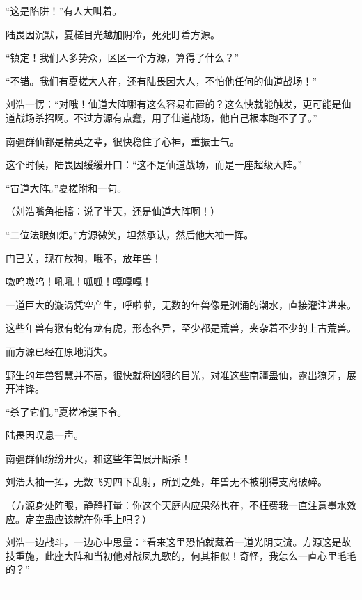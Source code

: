\begin{this_body}
“这是陷阱！”有人大叫着。

陆畏因沉默，夏槎目光越加阴冷，死死盯着方源。

“镇定！我们人多势众，区区一个方源，算得了什么？”

“不错。我们有夏槎大人在，还有陆畏因大人，不怕他任何的仙道战场！”

刘浩一愣：“对哦！仙道大阵哪有这么容易布置的？这么快就能触发，更可能是仙道战场杀招啊。不过方源有点蠢，用了仙道战场，他自己根本跑不了了。”

南疆群仙都是精英之辈，很快稳住了心神，重振士气。

这个时候，陆畏因缓缓开口：“这不是仙道战场，而是一座超级大阵。”

“宙道大阵。”夏槎附和一句。

（刘浩嘴角抽搐：说了半天，还是仙道大阵啊！）

“二位法眼如炬。”方源微笑，坦然承认，然后他大袖一挥。

门已关，现在放狗，哦不，放年兽！

嗷呜嗷呜！吼吼！呱呱！嘎嘎嘎！

一道巨大的漩涡凭空产生，呼啦啦，无数的年兽像是汹涌的潮水，直接灌注进来。

这些年兽有猴有蛇有龙有虎，形态各异，至少都是荒兽，夹杂着不少的上古荒兽。

而方源已经在原地消失。

野生的年兽智慧并不高，很快就将凶狠的目光，对准这些南疆蛊仙，露出獠牙，展开冲锋。

“杀了它们。”夏槎冷漠下令。

陆畏因叹息一声。

南疆群仙纷纷开火，和这些年兽展开厮杀！

刘浩大袖一挥，无数飞刃四下乱射，所到之处，年兽无不被削得支离破碎。

（方源身处阵眼，静静打量：你这个天庭内应果然也在，不枉费我一直注意墨水效应。定空蛊应该就在你手上吧？）

刘浩一边战斗，一边心中思量：“看来这里恐怕就藏着一道光阴支流。方源这是故技重施，此座大阵和当初他对战凤九歌的，何其相似！奇怪，我怎么一直心里毛毛的？”

------------

\end{this_body}

